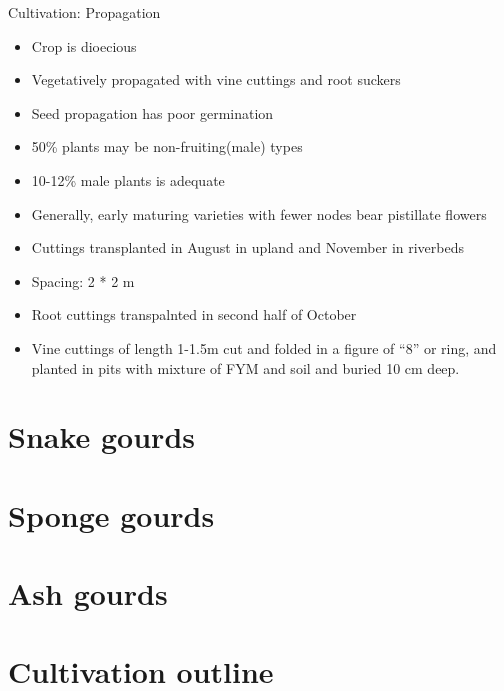 \documentclass[
  ignorenonframetext,
  aspectratio=169]{beamer}
\providecommand{\tightlist}{%
  \setlength{\itemsep}{0pt}\setlength{\parskip}{0pt}}
\begin{document}
\begin{frame}{Cultivation: Propagation}
\protect\hypertarget{cultivation-propagation-2}{}
\begin{itemize}
\tightlist
\item
  Crop is dioecious
\item
  Vegetatively propagated with vine cuttings and root suckers
\item
  Seed propagation has poor germination
\item
  50\% plants may be non-fruiting(male) types
\item
  10-12\% male plants is adequate
\item
  Generally, early maturing varieties with fewer nodes bear pistillate
  flowers
\item
  Cuttings transplanted in August in upland and November in riverbeds
\item
  Spacing: 2 * 2 m
\item
  Root cuttings transpalnted in second half of October
\item
  Vine cuttings of length 1-1.5m cut and folded in a figure of ``8'' or
  ring, and planted in pits with mixture of FYM and soil and buried 10
  cm deep.
\end{itemize}
\end{frame}

\hypertarget{snake-gourds}{%
\section{Snake gourds}\label{snake-gourds}}

\hypertarget{sponge-gourds}{%
\section{Sponge gourds}\label{sponge-gourds}}

\hypertarget{ash-gourds}{%
\section{Ash gourds}\label{ash-gourds}}

\hypertarget{cultivation-outline}{%
\section{Cultivation outline}\label{cultivation-outline}}
\end{document}
